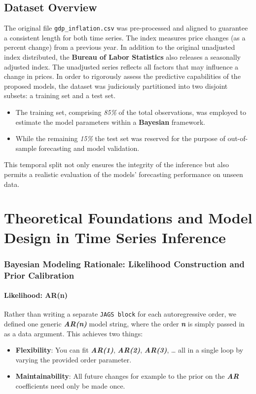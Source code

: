\documentclass{Configuration_Files/PoliMi3i_thesis}
\begin{document}
\section{Dataset Overview}
The original file \texttt{gdp\_inflation.csv} was pre-processed and aligned to guarantee a consistent length for both time series.
The index measures price changes (as a percent change) from a previous year. In addition to the original unadjusted index distributed, the \textbf{Bureau of Labor Statistics} also releases a seasonally adjusted index. The unadjusted series reflects all factors that may influence a change in prices. 
In order to rigorously assess the predictive capabilities of the proposed models, the dataset was judiciously partitioned into two disjoint subsets: a training set and a test set. 
\begin{itemize}
    \item The training set, comprising \textit{85\%} of the total observations, was employed to estimate the model parameters within a \textbf{Bayesian} framework.
    \item While the remaining \textit{15\%} the test set was reserved for the purpose of out-of-sample forecasting and model validation.
\end{itemize}
This temporal split not only ensures the integrity of the inference but also permits a realistic evaluation of the models’ forecasting performance on unseen data.

\chapter{Theoretical Foundations and Model Design in Time Series Inference}
\label{ch:chapter_two}
\subsection{Bayesian Modeling Rationale: Likelihood Construction and Prior Calibration}
\subsubsection{Likelihood: AR(n)}
Rather than writing a separate \texttt{JAGS block} for each autoregressive order, we defined one generic \textbf{\textit{AR(n)}} model string, where the order \textbf{\textit{n}} is simply passed in as a data argument.  This achieves two things:
\begin{itemize}
    \item \textbf{Flexibility}:  You can fit \textbf{\textit{AR(1)}}, \textbf{\textit{AR(2)}}, \textbf{\textit{AR(3)}}, … all in a single loop by varying the provided order parameter.
	\item \textbf{Maintainability}:  All future changes for example to the prior on the \textbf{\textit{AR}} coefficients need only be made once.
\end{itemize}
\end{document}
